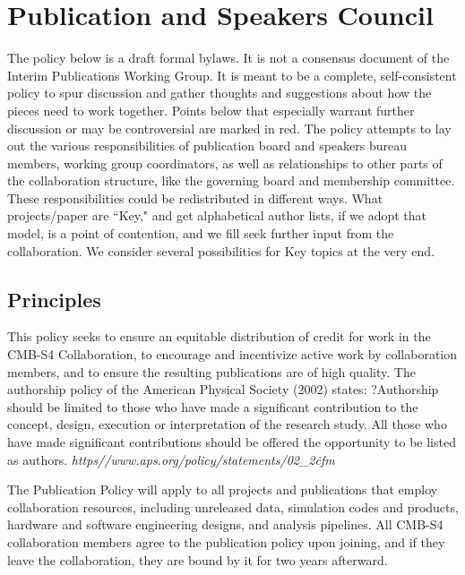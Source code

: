 \section{Publication and Speakers Council}
\label{sec:pub}



The policy below is a draft formal bylaws.  It is not a consensus document of the Interim Publications Working Group.  It is meant to be a complete, self-consistent policy to spur discussion and gather thoughts and suggestions about how the pieces need to work together. Points below that especially warrant further discussion or may be controversial are marked in red. The policy attempts to lay out the various responsibilities of publication board and speakers bureau members, working group coordinators, as well as relationships to other parts of the collaboration structure, like the governing board  and membership committee. These responsibilities could be redistributed in different ways. What projects/paper are ``Key," and get alphabetical author lists, if we adopt that model, is a point of contention, and we fill seek further input from the collaboration. We consider several possibilities for Key topics at the very end.


\subsection{Principles}
This policy seeks to ensure an equitable distribution of credit for work in the CMB-S4 Collaboration, to encourage and incentivize active work by collaboration members, and to ensure the resulting publications are of high quality. The authorship policy of the American Physical Society (2002) states: ?Authorship should be limited to those who have made a significant contribution to the concept, design, execution or interpretation of the research study. All those who have made significant contributions should be offered the opportunity to be listed as authors.  {\it https\://www.aps.org/policy/statements/02\_2\.cfm}

The Publication Policy will apply to all projects and publications that employ collaboration resources, including unreleased data, simulation codes and products, hardware and software
engineering designs, and analysis pipelines. All CMB-S4 collaboration members agree to the publication policy upon joining, and if they leave the collaboration, they are bound by it for two years afterward.

